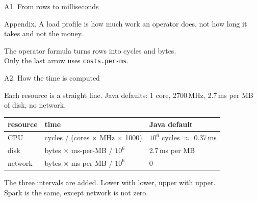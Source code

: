 \documentclass[aspectratio=169,11pt]{beamer}
\begin{document}
\begin{frame}{A1. From rows to milliseconds}

{\small Appendix. A load profile is how much work an operator does, not how long it takes and not the money.}

\vspace{0.5cm}
\centering
{}

\vspace{0.45cm}
{\small The operator formula turns rows into cycles and bytes.\\
Only the last arrow uses \texttt{costs.per-ms}.}
\end{frame}

\begin{frame}{A2. How the time is computed}

{\small Each resource is a straight line. Java defaults: 1 core, 2700\,MHz, 2.7\,ms per MB of disk, no network.}

\vspace{0.4cm}
\centering
\renewcommand{\arraystretch}{1.3}
\setlength{\tabcolsep}{8pt}
{\small
\begin{tabular}{@{}lll@{}}
\toprule
resource & time & Java default \\
\midrule
CPU & cycles / (cores $\times$ MHz $\times$ 1000) & $10^6$ cycles $\approx$ 0.37\,ms \\
disk & bytes $\times$ ms-per-MB / $10^6$ & 2.7\,ms per MB \\
network & bytes $\times$ ms-per-MB / $10^6$ & 0 \\
\bottomrule
\end{tabular}}

\vspace{0.4cm}
{\small The three intervals are added. Lower with lower, upper with upper.\\
Spark is the same, except network is not zero.}
\end{frame}
\end{document}
